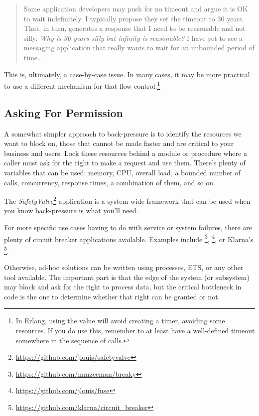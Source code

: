 \begin{quote}
Some application developers may push for no timeout and argue it is OK to wait indefinitely. I typically propose they set the timeout to 30 years. That, in turn, generates a response that I need to be reasonable and not silly. \emph{Why is 30 years silly but infinity is reasonable?} I have yet to see a messaging application that really wants to wait for an unbounded period of time…
\end{quote}

This is, ultimately, a case-by-case issue. In many cases, it may be more practical to use a different mechanism for that flow control.\footnote{In Erlang, using the value  will avoid creating a timer, avoiding some resources. If you do use this, remember to at least have a well-defined timeout somewhere in the sequence of calls.}

\subsection{Asking For Permission}

A somewhat simpler approach to back-pressure is to identify the resources we want to block on, those that cannot be made faster and are critical to your business and users. Lock these resources behind a module or procedure where a caller must ask for the right to make a request and use them. There's plenty of variables that can be used: memory, CPU, overall load, a bounded number of calls, concurrency, response times, a combination of them, and so on.

The \emph{SafetyValve}\footnote{\href{https://github.com/jlouis/safetyvalve}{https://github.com/jlouis/safetyvalve}} application is a system-wide framework that can be used when you know back-pressure is what you'll need.

For more specific use cases having to do with service or system failures, there are plenty of circuit breaker applications available. Examples include \footnote{\href{https://github.com/mmzeeman/breaky}{https://github.com/mmzeeman/breaky}}, \footnote{\href{https://github.com/jlouis/fuse}{https://github.com/jlouis/fuse}},  or Klarna's \footnote{\href{https://github.com/klarna/circuit\_breaker}{https://github.com/klarna/circuit\_breaker}}.

Otherwise, ad-hoc solutions can be written using processes, ETS, or any other tool available. The important part is that the edge of the system (or subsystem) may block and ask for the right to process data, but the critical bottleneck in code is the one to determine whether that right can be granted or not.

